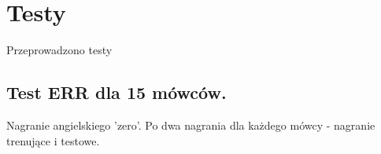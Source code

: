 \chapter{Testy}

Przeprowadzono testy 

\section{Test ERR dla 15 mówców.}

Nagranie angielskiego 'zero'. Po dwa nagrania dla każdego mówcy - nagranie trenujące i testowe.
